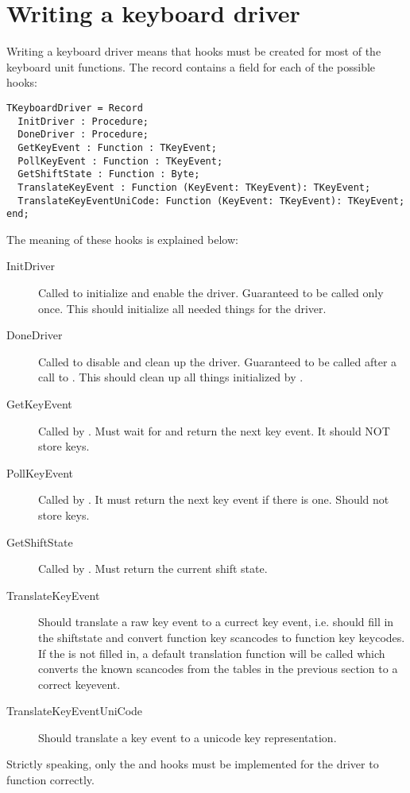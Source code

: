 \section{Writing a keyboard driver}
\label{se:kbddriver}
Writing a keyboard driver means that hooks must be created for most of the 
keyboard unit functions. The  record contains a field
for each of the possible hooks:
\begin{verbatim}
TKeyboardDriver = Record
  InitDriver : Procedure;
  DoneDriver : Procedure;
  GetKeyEvent : Function : TKeyEvent;
  PollKeyEvent : Function : TKeyEvent;
  GetShiftState : Function : Byte;
  TranslateKeyEvent : Function (KeyEvent: TKeyEvent): TKeyEvent;
  TranslateKeyEventUniCode: Function (KeyEvent: TKeyEvent): TKeyEvent;
end;
\end{verbatim}
The meaning of these hooks is explained below:
\begin{description}
\item[InitDriver] Called to initialize and enable the driver. 
Guaranteed to be called only once. This should initialize all needed things
for the driver.
\item[DoneDriver] Called to disable and clean up the driver. Guaranteed to be
called after a call to . This should clean up all
things initialized by .
\item[GetKeyEvent] Called by . Must wait for and return the
next key event. It should NOT store keys.
\item[PollKeyEvent] Called by . It must return the next key
event if there is one. Should not store keys. 
\item[GetShiftState] Called by .  Must return the current
shift state.
\item[TranslateKeyEvent] Should translate a raw key event to a currect
key event, i.e. should fill in the shiftstate and convert function key
scancodes to function key keycodes. If the
 is not filled in, a default translation function
will be called which converts the known scancodes from the tables in the
previous section to a correct keyevent.
\item[TranslateKeyEventUniCode] Should translate a key event to a unicode key
representation. 
\end{description}
Strictly speaking, only the  and 
hooks must be implemented for the driver to function correctly. 

